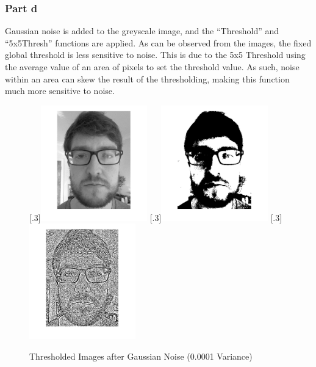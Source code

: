 \documentclass[a4paper]{article}
\begin{document}
	\subsubsection{Part d}
	Gaussian noise is added to the greyscale image, and the ``Threshold''
	and ``5x5Thresh'' functions are applied. As can be observed from the
	images, the fixed global threshold is less sensitive to noise. This is
	due to the 5x5 Threshold using the average value of an area of pixels to
	set the threshold value. As such, noise within an area can skew the
	result of the thresholding, making this function much more sensitive
	to noise.
	\begin{figure}[H]
		\centering
		[.3\linewidth]{\includegraphics[height=5cm]{Results/Q1/d/qdVar00001.jpg}}%
		[.3\linewidth]{\includegraphics[height=5cm]{Results/Q1/d/qdThresh00001.jpg}}%
		[.3\linewidth]{\includegraphics[height=5cm]{Results/Q1/d/qd5x500001.jpg}}%
		\caption{Thresholded Images after Gaussian Noise (0.0001
		Variance)}
		\label{fig:}
	\end{figure}
\end{document}
